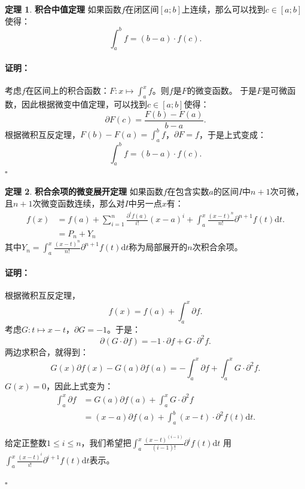 \documentclass[12pt,UTF8]{ctexbook}
\theoremstyle{definition}
\newtheorem{tm}{定理}[section]
\theoremstyle{plain}
\renewenvironment{proof}{\paragraph{\textbf{证明：}}}{\hfill$\square$}
\begin{document}
\begin{appendix}
\begin{tm}{\textbf{积合中值定理}}
    如果函数$f$在闭区间$[a; b]$上连续，那么可以找到$c\in[a;b]$使得：
    $$ \int_a^b f = (b - a)\cdot f(c).$$
\end{tm}

\begin{proof}
    考虑$f$在区间上的积合函数：$F: x\mapsto \int_a^x f$。则$f$是$F$的微变函数。
    于是$F$是可微函数，因此根据微变中值定理，可以找到$c\in[a;b]$使得：
    $$ \partial F(c) = \frac{F(b) - F(a)}{b - a}.$$
    根据微积互反定理，$F(b) - F(a) = \int_a^b f$，$\partial F = f$，于是上式变成：
    $$ \int_a^b f = (b - a)\cdot f(c).$$
\end{proof}


\begin{tm}{\textbf{积合余项的微变展开定理}}
    如果函数$f$在包含实数$a$的区间$I$中$n+1$次可微，且$n+1$次微变函数连续，那么对$I$中另一点$x$有：
    \begin{align*}
        f(x) &= f(a) + \sum_{i=1}^n \frac{\partial^i f(a)}{i!} (x - a)^i + \int_a^x \frac{(x - t)^{n}}{n!} \partial^{n+1} f(t)\mathrm{d}t. \\
        &= P_n + Y_n 
    \end{align*}
    其中$Y_n = \int_a^x \frac{(x - t)^{n}}{n!} \partial^{n+1} f(t)\mathrm{d}t$称为局部展开的$n$次积合余项。
\end{tm}

\begin{proof}
    根据微积互反定理，
    $$ f(x) = f(a) + \int_a^x \partial f .$$
    考虑$G : t \mapsto x - t $，$\partial G = -1$。于是：
    $$ \partial (G\cdot \partial f) = -1 \cdot \partial f + G \cdot \partial^2 f. $$
    两边求积合，就得到：
    $$ G(x) \partial f(x) - G(a) \partial f(a) = - \int_a^x \partial f + \int_a^x G \cdot \partial^2 f. $$
    $G(x) = 0$，因此上式变为：
    \begin{align*}
        \int_a^x \partial f &=  G(a) \partial f(a) + \int_a^x G \cdot \partial^2 f \\
        &= (x - a) \partial f(a) + \int_a^b (x - t) \cdot \partial^2 f(t)\mathrm{d}t. 
    \end{align*}
    
    给定正整数$1\leqslant i \leqslant n$，我们希望把$\int_a^x \frac{(x - t)^{(i-1)}}{(i-1)!} \partial^{i} f(t)\mathrm{d}t$
    用$\int_a^x \frac{(x - t)^{i}}{i!} \partial^{i+1} f(t)\mathrm{d}t$表示。


\end{proof}
\end{appendix}
\end{document}
